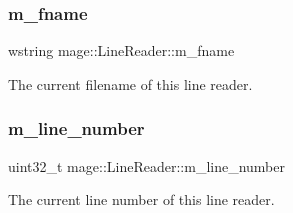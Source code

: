 \subsubsection{\texorpdfstring{m\+\_\+fname}{m\_fname}}
{\footnotesize\ttfamily wstring mage\+::\+Line\+Reader\+::m\+\_\+fname\hspace{0.3cm}{\ttfamily [private]}}

The current filename of this line reader. \hypertarget{classmage_1_1_line_reader_ada0b4ec5817b96c6b1bb43bd2573f8ba}{}\label{classmage_1_1_line_reader_ada0b4ec5817b96c6b1bb43bd2573f8ba} 
\subsubsection{\texorpdfstring{m\+\_\+line\+\_\+number}{m\_line\_number}}
{\footnotesize\ttfamily uint32\+\_\+t mage\+::\+Line\+Reader\+::m\+\_\+line\+\_\+number\hspace{0.3cm}{\ttfamily [private]}}

The current line number of this line reader. 